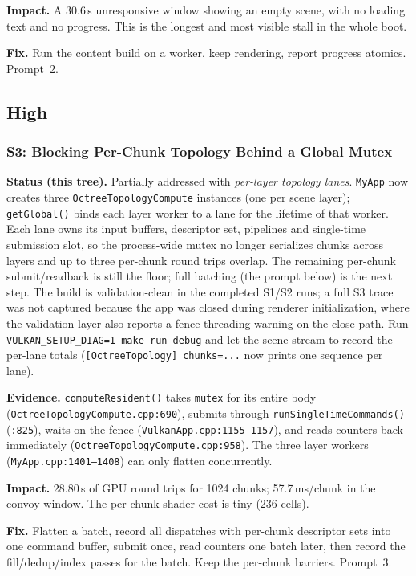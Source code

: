 \documentclass[11pt,a4paper]{article}
\begin{document}
\textbf{Impact.} A 30.6\,s unresponsive window showing an empty scene, with
no loading text and no progress. This is the longest and most visible stall
in the whole boot.

\textbf{Fix.} Run the content build on a worker, keep rendering, report
progress atomics. Prompt~2.

\subsection{High}

\subsubsection*{S3: Blocking Per-Chunk Topology Behind a Global Mutex}

\textbf{Status (this tree).} Partially addressed with \emph{per-layer topology
lanes}. \texttt{MyApp} now creates three \texttt{OctreeTopologyCompute}
instances (one per scene layer); \texttt{getGlobal()} binds each layer worker
to a lane for the lifetime of that worker. Each lane owns its input buffers,
descriptor set, pipelines and single-time submission slot, so the
process-wide mutex no longer serializes chunks across layers and up to three
per-chunk round trips overlap. The remaining per-chunk submit/readback is
still the floor; full batching (the prompt below) is the next step. The build
is validation-clean in the completed S1/S2 runs; a full S3 trace was not
captured because the app was closed during renderer initialization, where the
validation layer also reports a fence-threading warning on the close path.
Run \texttt{VULKAN\_SETUP\_DIAG=1 make run-debug} and let the scene stream to
record the per-lane totals (\texttt{[OctreeTopology] chunks=...} now prints
one sequence per lane).

\textbf{Evidence.} \texttt{computeResident()} takes \texttt{mutex} for its
entire body (\texttt{OctreeTopologyCompute.cpp:690}), submits through
\texttt{runSingleTimeCommands()} (\texttt{:825}), waits on the fence
(\texttt{VulkanApp.cpp:1155--1157}), and reads counters back immediately
(\texttt{OctreeTopologyCompute.cpp:958}). The three layer workers
(\texttt{MyApp.cpp:1401--1408}) can only flatten concurrently.

\textbf{Impact.} 28.80\,s of GPU round trips for 1024 chunks; 57.7\,ms/chunk
in the convoy window. The per-chunk shader cost is tiny (236 cells).

\textbf{Fix.} Flatten a batch, record all dispatches with per-chunk
descriptor sets into one command buffer, submit once, read counters one batch
later, then record the fill/dedup/index passes for the batch. Keep the
per-chunk barriers. Prompt~3.
\end{document}
